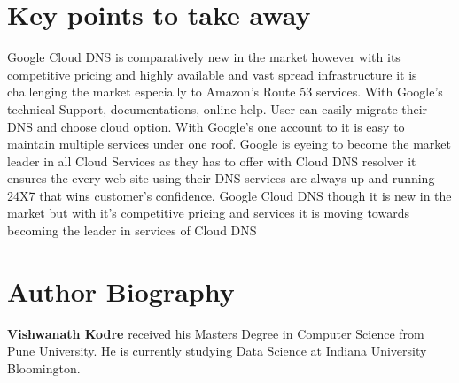 \documentclass[9pt,twocolumn,twoside]{styles/osajnl}
\begin{document}
\section{Key points to take away}
Google Cloud DNS is comparatively new in the market however with its competitive pricing and highly available and vast spread infrastructure it is challenging the market especially to Amazon’s Route 53 services. With Google’s technical Support, documentations, online help. User can easily migrate their DNS and choose cloud option. With Google’s one account to it is easy to maintain multiple services under one roof. Google is eyeing to become the market leader in all Cloud Services as they has to offer with Cloud DNS resolver it ensures the every web site using their DNS services are always up and running 24X7 that wins customer’s confidence. Google Cloud DNS though it is new in the market but with it’s competitive pricing and services it is moving towards becoming the leader in services of Cloud DNS

 
\section*{Author Biography}
\begingroup
\setlength\intextsep{0pt}
\begin{minipage}[t][3.2cm][t]{1.0\columnwidth} %
  \noindent
  {\bfseries Vishwanath Kodre} received his Masters Degree in Computer Science from Pune University.  He is currently studying Data Science at Indiana University Bloomington.
\end{minipage}
\endgroup
\end{document}
